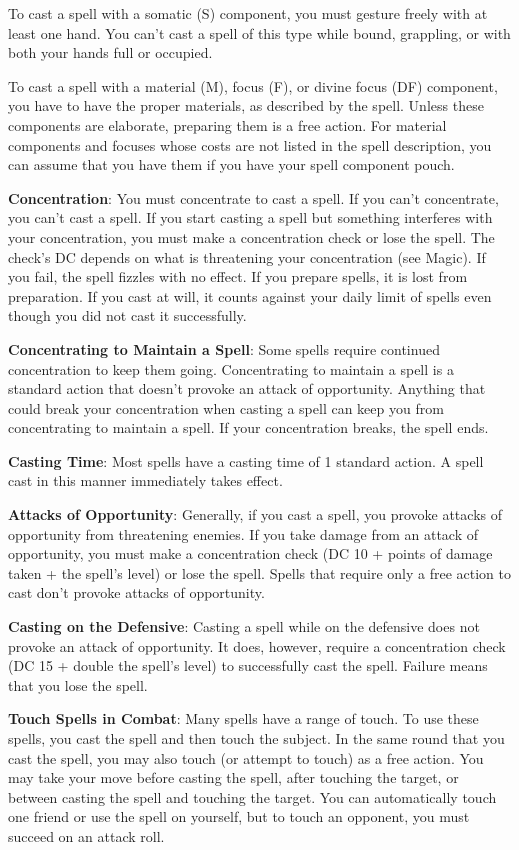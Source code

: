To cast a spell with a somatic (S) component, you must gesture freely with at least one hand. You can't cast a spell of this type while bound, grappling, or with both your hands full or occupied.
				
To cast a spell with a material (M), focus (F), or divine focus (DF) component, you have to have the proper materials, as described by the spell. Unless these components are elaborate, preparing them is a free action. For material components and focuses whose costs are not listed in the spell description, you can assume that you have them if you have your spell component pouch.
				
\textbf{Concentration}: You must concentrate to cast a spell. If you can't concentrate, you can't cast a spell. If you start casting a spell but something interferes with your concentration, you must make a concentration check or lose the spell. The check's DC depends on what is threatening your concentration (see Magic). If you fail, the spell fizzles with no effect. If you prepare spells, it is lost from preparation. If you cast at will, it counts against your daily limit of spells even though you did not cast it successfully.
				
\textbf{Concentrating to Maintain a Spell}: Some spells require continued concentration to keep them going. Concentrating to maintain a spell is a standard action that doesn't provoke an attack of opportunity. Anything that could break your concentration when casting a spell can keep you from concentrating to maintain a spell. If your concentration breaks, the spell ends.
				
\textbf{Casting Time}: Most spells have a casting time of 1 standard action. A spell cast in this manner immediately takes effect.
				
\textbf{Attacks of Opportunity}: Generally, if you cast a spell, you provoke attacks of opportunity from threatening enemies. If you take damage from an attack of opportunity, you must make a concentration check (DC 10 + points of damage taken + the spell's level) or lose the spell. Spells that require only a free action to cast don't provoke attacks of opportunity.
				
\textbf{Casting on the Defensive}: Casting a spell while on the defensive does not provoke an attack of opportunity. It does, however, require a concentration check (DC 15 + double the spell's level) to successfully cast the spell. Failure means that you lose the spell.
				
\textbf{Touch Spells in Combat}: Many spells have a range of touch. To use these spells, you cast the spell and then touch the subject. In the same round that you cast the spell, you may also touch (or attempt to touch) as a free action. You may take your move before casting the spell, after touching the target, or between casting the spell and touching the target. You can automatically touch one friend or use the spell on yourself, but to touch an opponent, you must succeed on an attack roll.
				
